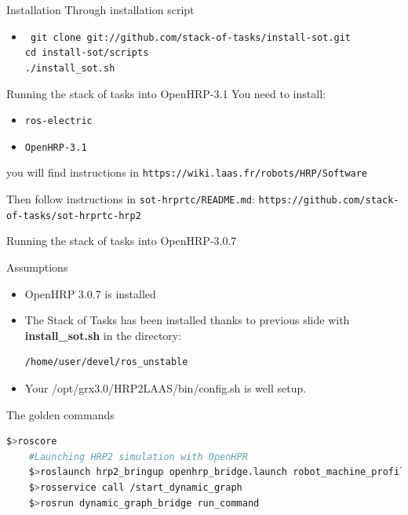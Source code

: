 %
%

\begin{frame} {Installation}
  Through installation script
  \begin{itemize}
  \item \texttt{\tiny
    git clone git://github.com/stack-of-tasks/install-sot.git\\
    cd install-sot/scripts\\
    ./install\_sot.sh
  }
  \end{itemize}
\end{frame}

%
%

\begin{frame} {Running the stack of tasks into OpenHRP-3.1}
  You need to install:
  \begin{itemize}
    \item \texttt{ros-electric}
    \item \texttt{OpenHRP-3.1}
  \end{itemize}
  you will find instructions in \texttt{\tiny https://wiki.laas.fr/robots/HRP/Software}

  Then follow instructions in \texttt{\tiny sot-hrprtc/README.md}: \texttt{https://github.com/stack-of-tasks/sot-hrprtc-hrp2}
\end{frame}

%
%

\begin{frame}[fragile]{Running the stack of tasks into OpenHRP-3.0.7}
  \begin{block}{Assumptions}
    \begin{itemize}
      \item OpenHRP 3.0.7 is installed
      \item The Stack of Tasks has been installed thanks to previous slide with
        \textbf{install\_sot.sh} in the directory:
        \begin{lstlisting}[language=bash,basicstyle=\small,frame=single,showlines=false]    
          /home/user/devel/ros_unstable
        \end{lstlisting}
      \item Your /opt/grx3.0/HRP2LAAS/bin/config.sh is well setup.
    \end{itemize}
  \end{block}
  \begin{block}{The golden commands}
  \begin{lstlisting}[language=bash,basicstyle=\tiny,backgroundcolor=\color{AliceBlue}, frame=single,showlines=false]
    $>roscore
    #Launching HRP2 simulation with OpenHPR
    $>roslaunch hrp2_bringup openhrp_bridge.launch robot_machine_profile:=sim
    $>rosservice call /start_dynamic_graph 
    $>rosrun dynamic_graph_bridge run_command
  \end{lstlisting}
  \end{block}
\end{frame}

